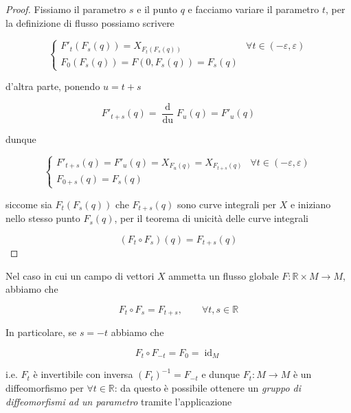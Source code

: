 \begin{proof}
	Fissiamo il parametro $ s $ e il punto $ q $ e facciamo variare il parametro $ t $, per la definizione di flusso possiamo scrivere
	
	\begin{equation}
		\begin{cases}
			F'_{t}(F_{s}(q)) = X_{F_{t}(F_{s}(q))} & \forall t \in (-\varepsilon,\varepsilon)\\
			F_{0}(F_{s}(q)) = F(0,F_{s}(q)) = F_{s}(q)
		\end{cases}
	\end{equation}

	d'altra parte, ponendo $ u = t+s $
	
	\begin{equation}
		F'_{t+s}(q) = \dfrac{\operatorname{d}}{\operatorname{du}} F_{u}(q) = F'_{u}(q)
	\end{equation}

	dunque
	
	\begin{equation}
		\begin{cases}
			F'_{t+s}(q) = F'_{u}(q) = X_{F_{u}(q)} = X_{F_{t+s}(q)} & \forall t \in (-\varepsilon,\varepsilon)\\
			F_{0+s}(q) = F_{s}(q)
		\end{cases}
	\end{equation}

	siccome sia $ F_{t}(F_{s}(q)) $ che $ F_{t+s}(q) $ sono curve integrali per $ X $ e iniziano nello stesso punto $ F_{s}(q) $, per il teorema di unicità delle curve integrali
	
	\begin{equation}
		(F_{t} \circ F_{s})(q) = F_{t+s}(q)
	\end{equation}
\end{proof}

Nel caso in cui un campo di vettori $ X $ ammetta un flusso globale $ F : \mathbb{R} \times M \to M $, abbiamo che

\begin{equation}
	F_{t} \circ F_{s} = F_{t+s}, \qquad \forall t,s \in \mathbb{R}
\end{equation}

In particolare, se $ s = -t $ abbiamo che

\begin{equation}
	F_{t} \circ F_{-t} = F_{0} = \operatorname{id}_{M}
\end{equation}

i.e. $ F_{t} $ è invertibile con inversa $ (F_{t})^{-1} = F_{-t} $ e dunque $ F_{t} : M \to M $ è un diffeomorfismo per $ \forall t \in \mathbb{R} $: da questo è possibile ottenere un \textit{gruppo di diffeomorfismi ad un parametro} tramite l'applicazione

